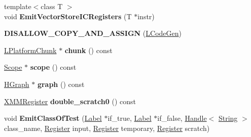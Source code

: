 \begin{DoxyCompactItemize}
\item 
{\footnotesize template$<$class T $>$ }\\void {\bfseries Emit\+Vector\+Store\+I\+C\+Registers} (T $\ast$instr)\hypertarget{classv8_1_1internal_1_1_l_code_gen_a84c9b0e87f89361233a5c74e43d689cb}{}\label{classv8_1_1internal_1_1_l_code_gen_a84c9b0e87f89361233a5c74e43d689cb}

\item 
{\bfseries D\+I\+S\+A\+L\+L\+O\+W\+\_\+\+C\+O\+P\+Y\+\_\+\+A\+N\+D\+\_\+\+A\+S\+S\+I\+GN} (\hyperlink{classv8_1_1internal_1_1_l_code_gen}{L\+Code\+Gen})\hypertarget{classv8_1_1internal_1_1_l_code_gen_a475eb7b3d7738263ae865905cf36b985}{}\label{classv8_1_1internal_1_1_l_code_gen_a475eb7b3d7738263ae865905cf36b985}

\item 
\hyperlink{classv8_1_1internal_1_1_l_platform_chunk}{L\+Platform\+Chunk} $\ast$ {\bfseries chunk} () const \hypertarget{classv8_1_1internal_1_1_l_code_gen_a142977dd477b3857fdef0e31a669bc80}{}\label{classv8_1_1internal_1_1_l_code_gen_a142977dd477b3857fdef0e31a669bc80}

\item 
\hyperlink{classv8_1_1internal_1_1_scope}{Scope} $\ast$ {\bfseries scope} () const \hypertarget{classv8_1_1internal_1_1_l_code_gen_a2b85c964ccc4e59f50d49d19b0ed5ce0}{}\label{classv8_1_1internal_1_1_l_code_gen_a2b85c964ccc4e59f50d49d19b0ed5ce0}

\item 
\hyperlink{classv8_1_1internal_1_1_h_graph}{H\+Graph} $\ast$ {\bfseries graph} () const \hypertarget{classv8_1_1internal_1_1_l_code_gen_a3ac5173baaba9927d906efc5071d1189}{}\label{classv8_1_1internal_1_1_l_code_gen_a3ac5173baaba9927d906efc5071d1189}

\item 
\hyperlink{structv8_1_1internal_1_1_double_register}{X\+M\+M\+Register} {\bfseries double\+\_\+scratch0} () const \hypertarget{classv8_1_1internal_1_1_l_code_gen_a0c0eb4edd82abc3bdab18f8720ed44d6}{}\label{classv8_1_1internal_1_1_l_code_gen_a0c0eb4edd82abc3bdab18f8720ed44d6}

\item 
void {\bfseries Emit\+Class\+Of\+Test} (\hyperlink{classv8_1_1internal_1_1_label}{Label} $\ast$if\+\_\+true, \hyperlink{classv8_1_1internal_1_1_label}{Label} $\ast$if\+\_\+false, \hyperlink{classv8_1_1internal_1_1_handle}{Handle}$<$ \hyperlink{classv8_1_1internal_1_1_string}{String} $>$ class\+\_\+name, \hyperlink{structv8_1_1internal_1_1_register}{Register} input, \hyperlink{structv8_1_1internal_1_1_register}{Register} temporary, \hyperlink{structv8_1_1internal_1_1_register}{Register} scratch)\hypertarget{classv8_1_1internal_1_1_l_code_gen_aa6a1d66bc1e3dee98dbe51cc12917183}{}\label{classv8_1_1internal_1_1_l_code_gen_aa6a1d66bc1e3dee98dbe51cc12917183}


\end{DoxyCompactItemize}
